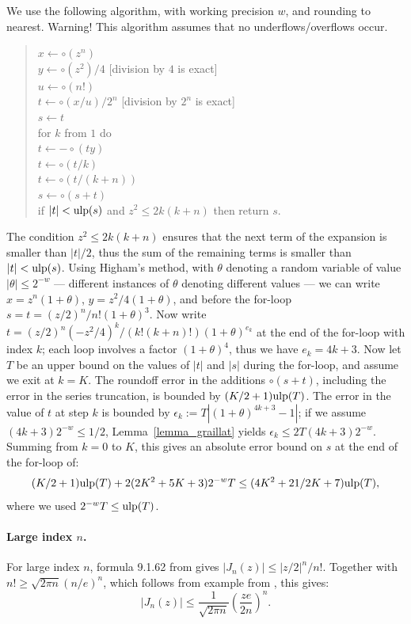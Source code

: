 \documentclass[12pt]{amsart}
\def\q{\hspace*{5mm}}
\def\ulp{{\rm ulp}}
\begin{document}
We use the following algorithm, with working precision $w$, and rounding
to nearest. Warning! This algorithm assumes that no underflows/overflows
occur.
\begin{quote}
$x \leftarrow \circ(z^n)$ \\
$y \leftarrow \circ(z^2)/4$ [division by $4$ is exact] \\
$u \leftarrow \circ(n!)$ \\
$t \leftarrow \circ(x/u)/2^n$ [division by $2^n$ is exact] \\
$s \leftarrow t$ \\
for $k$ from $1$ do \\
\q $t \leftarrow -\circ(ty)$ \\
\q $t \leftarrow \circ(t/k)$ \\
\q $t \leftarrow \circ(t/(k+n))$ \\
\q $s \leftarrow \circ(s+t)$ \\
\q if $|t| < \ulp(s)$ and $z^2 \leq 2k(k+n)$ then return $s$. \\
\end{quote}
The condition $z^2 \leq 2k(k+n)$ ensures that the next term of the
expansion is smaller than $|t|/2$, thus the sum of the remaining terms
is smaller than $|t| < \ulp(s)$.
Using Higham's method, with $\theta$ denoting a random variable of value
$|\theta| \leq 2^{-w}$ --- different instances of $\theta$ denoting
different values --- we can write $x = z^n (1+\theta)$,
$y = z^2/4 (1+\theta)$,
and before the for-loop $s = t = (z/2)^n/n! (1+\theta)^3$.
Now write $t = (z/2)^n (-z^2/4)^k / (k! (k+n)!) (1+\theta)^{e_k}$ at the end of
the for-loop with index $k$; each loop involves a factor $(1+\theta)^4$,
thus we have $e_k = 4k+3$.
Now let $T$ be an upper bound on the values of $|t|$ and $|s|$ during the
for-loop, and assume we exit at $k=K$.
The roundoff error in the additions
$\circ(s+t)$, including the error in the series
truncation, is bounded by $(K/2+1) \ulp(T)$.
The error in the value of $t$ at step $k$ is bounded by $\epsilon_k :=
T |(1+\theta)^{4k+3}
-1|$; if we assume $(4k+3) 2^{-w} \leq 1/2$, Lemma~\ref{lemma_graillat}
yields $\epsilon_k \leq 2 T (4k+3) 2^{-w}$. Summing from $k=0$ to $K$,
this gives an absolute error bound on $s$ at the end of the for-loop of:
\[ (K/2+1) \ulp(T) + 2 (2K^2+5K+3) 2^{-w} T \leq (4K^2+21/2K+7) \ulp(T), \]
where we used $2^{-w} T \leq \ulp(T)$.

\paragraph{Large index $n$.}
For large index $n$, formula 9.1.62 from \cite{AbSt73} gives
$|J_n(z)| \leq |z/2|^n/n!$.
Together with $n! \geq \sqrt{2 \pi n} (n/e)^n$, which follows from example
from \cite[Eq.~6.1.38]{AbSt73}, this gives:
\[ |J_n(z)| \leq \frac{1}{\sqrt{2 \pi n}} \left( \frac{ze}{2n} \right)^n. \]
\end{document}
